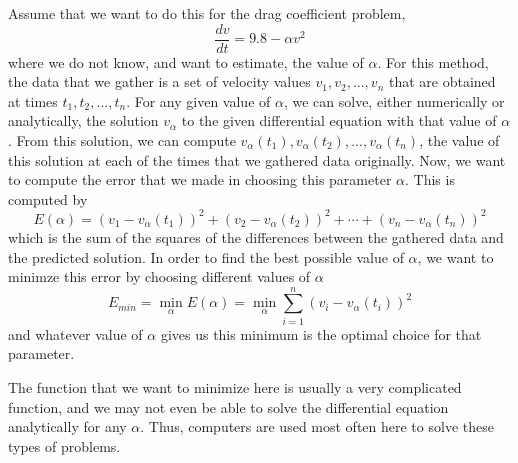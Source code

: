Assume that we want to do this for the drag coefficient problem, 
\begin{equation*}
\frac{dv}{dt} = 9.8 - \alpha v^2
\end{equation*}
where we do not know, and want to estimate, the value of $\alpha$. For this method, the data that we gather is a set of velocity values $v_1, v_2, ..., v_n$ that are obtained at times $t_1, t_2, ..., t_n$. For any given value of $\alpha$, we can solve, either numerically or analytically, the solution $v_\alpha$ to the given differential equation with that value of $\alpha$. From this solution, we can compute $v_\alpha(t_1), v_\alpha(t_2),..., v_\alpha(t_n)$, the value of this solution at each of the times that we gathered data originally. Now, we want to compute the error that we made in choosing this parameter $\alpha$. This is computed by 
\begin{equation*}
E(\alpha) = (v_1 - v_\alpha(t_1))^2 + (v_2 - v_\alpha(t_2))^2 + \cdots  + (v_n - v_\alpha(t_n))^2
\end{equation*}
which is the sum of the squares of the differences between the gathered data and the predicted solution. In order to find the best possible value of $\alpha$, we want to minimze this error by choosing different values of $\alpha$
\begin{equation*}
E_{min} = \min_\alpha E(\alpha) = \min_\alpha \sum_{i=1}^n (v_i - v_\alpha(t_i))^2
\end{equation*}
and whatever value of $\alpha$ gives us this minimum is the optimal choice for that parameter. 

The function that we want to minimize here is usually a very complicated function, and we may not even be able to solve the differential equation analytically for any $\alpha$. Thus, computers are used most often here to solve these types of problems.

